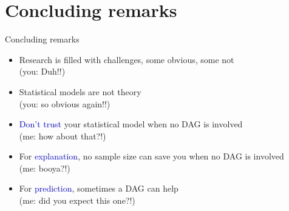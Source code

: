 \section{Concluding remarks}
%
\begin{frame}[negative]
	\sectionpage
\end{frame}
%
%
\begin{lhframe}[rhgraphic={\texttt{[image: think.jpg]}}]
	{Concluding remarks}
	
	\begin{itemize}
		\item Research is filled with challenges, some obvious, some not \\
		{\small (you: Duh!!) }
		\item Statistical models are not theory \\
		{\small (you: so obvious again!!) }
		\item \textcolor{blue}{Don't trust} your statistical model when no DAG is involved \\
		{\small (me: how about that?!) }
		\item For \textcolor{blue}{explanation}, no sample size can save you when no DAG is involved \\
		{\small (me: booya?!) }
		\item For \textcolor{blue}{prediction}, sometimes a DAG can help \\
		{\small (me: did you expect this one?!)}
	\end{itemize} 
\end{lhframe}
%
%